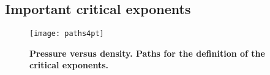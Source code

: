 \subsection{Important critical exponents}


\begin{figure}[htbp]
\begin{center}
\texttt{[image: paths4pt]}
\caption{{\bf Pressure versus density. Paths for the definition of the critical exponents.}}
\end{center}
\end{figure}



